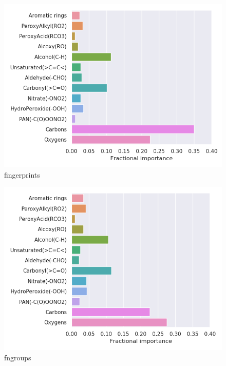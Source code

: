 \begin{subfigure}[b]{0.46\textwidth}
    \centering
    \includegraphics[width=\textwidth]{outputs/t-SNE/fingerprints/legend.png}
    \caption{fingerprints}
    \label{fig:legend_t-SNE_fingerprints}
\end{subfigure}
\begin{subfigure}[b]{0.46\textwidth}
    \centering
    \includegraphics[width=\textwidth]{outputs/t-SNE/fngroups/legend.png}
    \caption{fngroups}
    \label{fig:legend_t-SNE_fngroups}
\end{subfigure}\\
